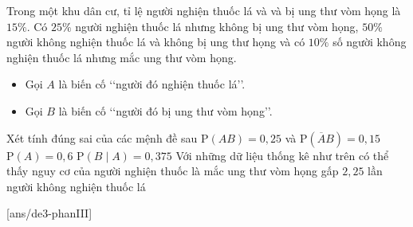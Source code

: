 \begin{ex}%
	Trong một khu dân cư, tỉ lệ người nghiện thuốc lá và và bị ung thư vòm họng là $15\%$. Có $25\%$ người nghiện thuốc lá nhưng không bị ung thư vòm họng, $50\%$ người không nghiện thuốc lá và không bị ung thư họng và có $10\%$ số người không nghiện thuốc lá nhưng mắc ung thư vòm họng.
	\begin{itemize}
		\item Gọi $A$ là biến cố \lq\lq người đó nghiện thuốc lá\rq\rq.
		\item Gọi $B$ là biến cố \lq\lq người đó bị ung thư vòm họng\rq\rq.
	\end{itemize}
	Xét tính đúng sai của các mệnh đề sau
	\choiceTF
	{$\mathrm{P}(AB)=0{,}25$ và $\mathrm{P}(\overline{A}B)=0{,}15$}
	{$\mathrm{P}(A)=0{,}6$}
	{\True $\mathrm{P}(B\mid A)=0{,}375$}
	{\True Với những dữ liệu thống kê như trên có thể thấy nguy cơ của người nghiện thuốc là mắc ung thư vòm họng gấp $2{,}25$ lần người không nghiện thuốc lá}
\end{ex}
\TNSA
[ans/de3-phanIII]

